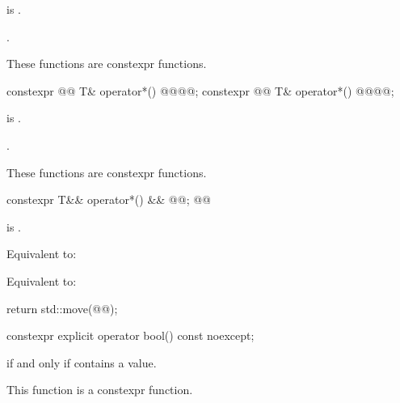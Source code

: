\begin{itemdescr}
\pnum
\hardexpects
{} is .

\pnum
\returns
{}.

\pnum
\remarks
These functions are constexpr functions.
\end{itemdescr}

%
\begin{itemdecl}
constexpr @@ T& operator*() @@@\added{\&}@;
constexpr @@ T& operator*() @@@@;
\end{itemdecl}

\begin{itemdescr}
\pnum
\hardexpects
{} is .

\pnum
\returns
{}.

\pnum
\remarks
These functions are constexpr functions.
\end{itemdescr}

%
\begin{itemdecl}
constexpr T&& operator*() && @@;
@@
\end{itemdecl}

\begin{itemdescr}
\pnum
\hardexpects
{} is .

\begin{removedblock}
\pnum
\effects
Equivalent to: 
\end{removedblock}

\begin{addedblock}
\pnum
Equivalent to:
\begin{codeblock}
return std::move(@@);
\end{codeblock}
\end{addedblock}
\end{itemdescr}

%
\begin{itemdecl}
constexpr explicit operator bool() const noexcept;
\end{itemdecl}

\begin{itemdescr}
\pnum
\returns
{} if and only if  contains a value.

\pnum
\remarks
This function is a constexpr function.
\end{itemdescr}

